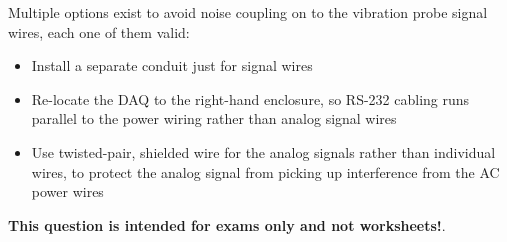 Multiple options exist to avoid noise coupling on to the vibration probe signal wires, each one of them valid:

\begin{itemize}
\item{} Install a separate conduit just for signal wires
\item{} Re-locate the DAQ to the right-hand enclosure, so RS-232 cabling runs parallel to the power wiring rather than analog signal wires
\item{} Use twisted-pair, shielded wire for the analog signals rather than individual wires, to protect the analog signal from picking up interference from the AC power wires
\end{itemize}







{\bf This question is intended for exams only and not worksheets!}.



